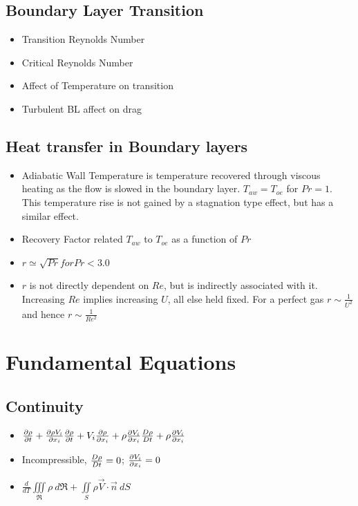 \documentclass[a4paper]{article}
\begin{document}
    \subsection{Boundary Layer Transition}
    \begin{itemize}
        \item Transition Reynolds Number
        \item Critical Reynolds Number
        \item Affect of Temperature on transition
        \item Turbulent BL affect on drag
    \end{itemize}

    \subsection{Heat transfer in Boundary layers}
    \begin{itemize}
        \item Adiabatic Wall Temperature is temperature recovered through viscous heating as the flow is slowed in the boundary layer. $T_{aw} = T_{oe}$ for $Pr = 1$. This temperature rise is not gained by a stagnation type effect, but has a similar effect. 
        \item Recovery Factor related $T_{aw}$ to $T_{oe}$ as a function of $Pr$
        \item $r \simeq \sqrt{Pr} for Pr < 3.0$
        \item $r$ is not directly dependent on $Re$, but is indirectly associated with it. Increasing $Re$ implies 
        increasing $U$, all else held fixed. For a perfect gas $r \sim \frac{1}{U^2}$ and hence $r \sim \frac{1}{Re^2}$
    \end{itemize}

\section{Fundamental Equations}   
    \subsection{Continuity}
        \begin{itemize}
            \item $\partderiv{\rho}{t} + \partderiv{\rho V_i}{x_i} \\%
            \partderiv{\rho}{t} + V_i \partderiv{\rho}{x_i} + \rho \partderiv{V_i}{x_i} \\%
            \matderiv{\rho}{t} + \rho \partderiv{V_i}{x_i}$ 
            \item Incompressible, $\frac{D \rho}{D t} = 0$; $\frac{\partial V_i}{\partial x_i} = 0$
            \item $\frac{d}{dT} \iiint\limits_{\mathfrak{R}} \rho\  d\mathfrak{R} + \iint\limits_{S} \rho \vec{V} \cdot \vec{n}\  dS$
        \end{itemize}
\end{document}
